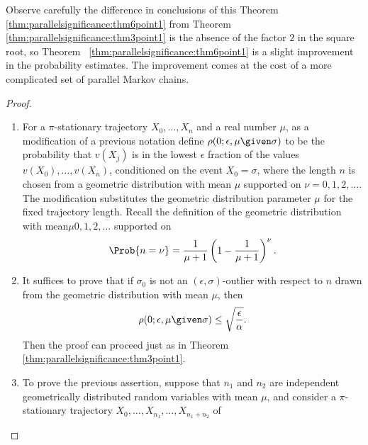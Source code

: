 \documentclass[12pt]{article}
\begin{document}
\begin{remark}
    Observe carefully the difference in conclusions of this Theorem~%
    \ref{thm:parallelsignificance:thm6point1} from Theorem~%
    \ref{thm:parallelsignificance:thm3point1} is the absence of the
    factor \( 2 \) in the square root, so Theorem~%
    \ref{thm:parallelsignificance:thm6point1} is a slight improvement in
    the probability estimates.  The improvement comes at the cost of a
    more complicated set of parallel Markov chains.
\end{remark}

\begin{proof}
    \begin{enumerate}
        \item
            For a \( \pi \)-stationary trajectory \( X_0, \dots, X_n \)
            and a real number \( \mu \), as a modification of a previous
            notation define \( \rho(0; \epsilon, \mu \given \sigma) \)
            to be the probability that \( v(X_j) \) is in the lowest \(
            \epsilon \) fraction of the values \( v(X_0), \dots, v(X_n) \),
            conditioned on the event \( X_0 = \sigma \), where the
            length \( n \) is chosen from a geometric distribution with
            mean \( \mu \) supported on \( \nu = 0,1,2,\dots \).  The
            modification substitutes the geometric distribution
            parameter \( \mu \) for the fixed trajectory length.  Recall
            the definition of the geometric distribution with mean\( \mu
            0,1,2,\dots \) supported on
            \[
                \Prob{n = \nu} = \frac{1}{\mu+1}\left( 1 - \frac{1}{\mu+1}
                \right)^\nu.
            \]
        \item
            \label{enum:parallelchain:eq15} It suffices to prove that if
            \( \sigma_0 \) is not an \( (\epsilon, \sigma) \)-outlier
            with respect to \( n \) drawn from the geometric
            distribution with mean \( \mu \), then
            \[
                \rho(0; \epsilon, \mu \given \sigma) \le \sqrt{\frac{\epsilon}
                {\alpha}}.
            \] Then the proof can proceed just as in Theorem~%
            \ref{thm:parallelsignificance:thm3point1}.
        \item
            To prove the previous assertion, suppose that \( n_1 \) and \(
            n_2 \) are independent geometrically distributed random
            variables with mean \( \mu \), and consider a \( \pi \)-stationary
            trajectory \( X_0, \dots, X_{n_1}, \dots, X_{n_1 +n_2} \) of

\end{enumerate}
\end{proof}
\end{document}
